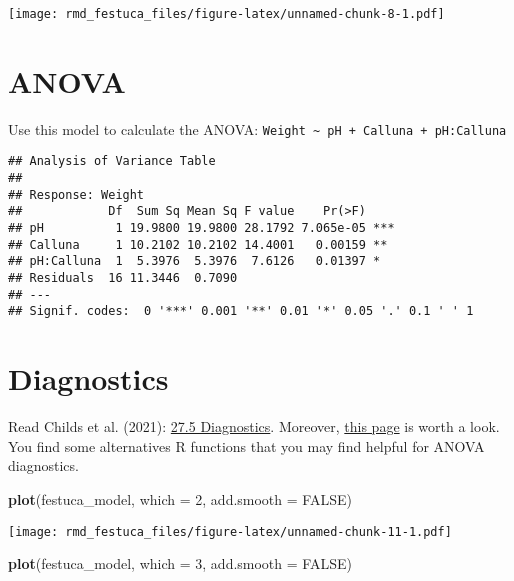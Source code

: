 \documentclass[
]{article}
\newenvironment{Shaded}{\begin{snugshade}}{\end{snugshade}}
\newcommand{\AttributeTok}[1]{\textcolor[rgb]{0.13,0.29,0.53}{#1}}
\newcommand{\ConstantTok}[1]{\textcolor[rgb]{0.56,0.35,0.01}{#1}}
\newcommand{\DecValTok}[1]{\textcolor[rgb]{0.00,0.00,0.81}{#1}}
\newcommand{\FunctionTok}[1]{\textcolor[rgb]{0.13,0.29,0.53}{\textbf{#1}}}
\newcommand{\NormalTok}[1]{#1}
\begin{document}
\texttt{[image: rmd\_festuca\_files/figure-latex/unnamed-chunk-8-1.pdf]}

\hypertarget{anova}{%
\section{ANOVA}\label{anova}}

Use this model to calculate the ANOVA:
\texttt{Weight\ \textasciitilde{}\ pH\ +\ Calluna\ +\ pH:Calluna}

\begin{verbatim}
## Analysis of Variance Table
## 
## Response: Weight
##            Df  Sum Sq Mean Sq F value    Pr(>F)    
## pH          1 19.9800 19.9800 28.1792 7.065e-05 ***
## Calluna     1 10.2102 10.2102 14.4001   0.00159 ** 
## pH:Calluna  1  5.3976  5.3976  7.6126   0.01397 *  
## Residuals  16 11.3446  0.7090                      
## ---
## Signif. codes:  0 '***' 0.001 '**' 0.01 '*' 0.05 '.' 0.1 ' ' 1
\end{verbatim}

\hypertarget{diagnostics}{%
\section{Diagnostics}\label{diagnostics}}

Read Childs et al. (2021):
\href{https://dzchilds.github.io/stats-for-bio/two-way-anova-in-r.html\#diagnostics}{27.5
Diagnostics}. Moreover,
\href{https://www.datanovia.com/en/lessons/anova-in-r/}{this page} is
worth a look. You find some alternatives R functions that you may find
helpful for ANOVA diagnostics.

\begin{Shaded}
\begin{Highlighting}[]
\FunctionTok{plot}\NormalTok{(festuca\_model, }\AttributeTok{which =} \DecValTok{2}\NormalTok{, }\AttributeTok{add.smooth =} \ConstantTok{FALSE}\NormalTok{)}
\end{Highlighting}
\end{Shaded}

\texttt{[image: rmd\_festuca\_files/figure-latex/unnamed-chunk-11-1.pdf]}

\begin{Shaded}
\begin{Highlighting}[]
\FunctionTok{plot}\NormalTok{(festuca\_model, }\AttributeTok{which =} \DecValTok{3}\NormalTok{, }\AttributeTok{add.smooth =} \ConstantTok{FALSE}\NormalTok{)}
\end{Highlighting}
\end{Shaded}
\end{document}

